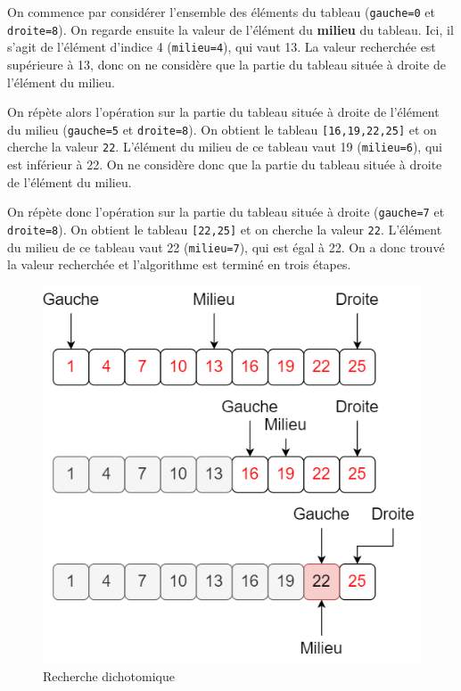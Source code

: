 \documentclass[
  a4paper,
  DIV=11,
  numbers=noendperiod]{scrartcl}
\begin{document}
On commence par considérer l'ensemble des éléments du tableau
(\texttt{gauche=0} et \texttt{droite=8}). On regarde ensuite la valeur
de l'élément du \textbf{milieu} du tableau. Ici, il s'agit de l'élément
d'indice 4 (\texttt{milieu=4}), qui vaut 13. La valeur recherchée est
supérieure à 13, donc on ne considère que la partie du tableau située à
droite de l'élément du milieu.

On répète alors l'opération sur la partie du tableau située à droite de
l'élément du milieu (\texttt{gauche=5} et \texttt{droite=8}). On obtient
le tableau \texttt{{[}16,19,22,25{]}} et on cherche la valeur
\texttt{22}. L'élément du milieu de ce tableau vaut 19
(\texttt{milieu=6}), qui est inférieur à 22. On ne considère donc que la
partie du tableau située à droite de l'élément du milieu.

On répète donc l'opération sur la partie du tableau située à droite
(\texttt{gauche=7} et \texttt{droite=8}). On obtient le tableau
\texttt{{[}22,25{]}} et on cherche la valeur \texttt{22}. L'élément du
milieu de ce tableau vaut 22 (\texttt{milieu=7}), qui est égal à 22. On
a donc trouvé la valeur recherchée et l'algorithme est terminé en trois
étapes.

\begin{figure}

{\centering \includegraphics{./recherche_dicho.png}

}

\caption{Recherche dichotomique}

\end{figure}
\end{document}
